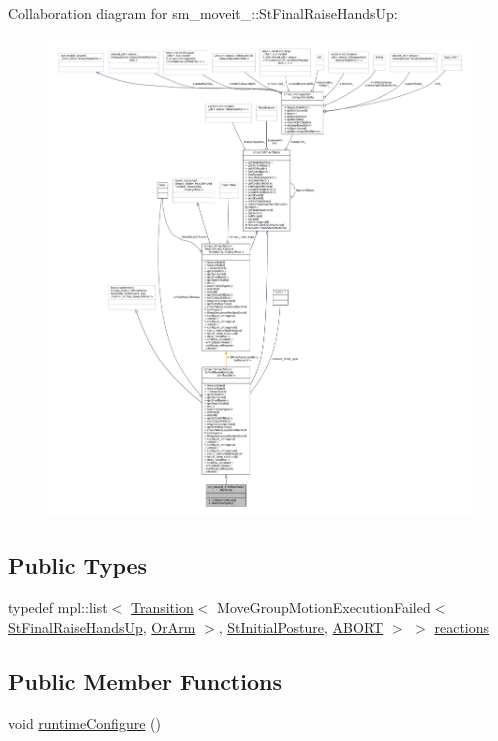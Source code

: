 Collaboration diagram for sm\+\_\+moveit\+\_\+:\+:St\+Final\+Raise\+Hands\+Up\+:
\nopagebreak
\begin{figure}[H]
\begin{center}
\leavevmode
\includegraphics[width=350pt]{structsm__moveit__4_1_1StFinalRaiseHandsUp__coll__graph}
\end{center}
\end{figure}
\subsection*{Public Types}
\begin{DoxyCompactItemize}
\item 
typedef mpl\+::list$<$ \hyperlink{classsmacc_1_1Transition}{Transition}$<$ Move\+Group\+Motion\+Execution\+Failed$<$ \hyperlink{structsm__moveit__4_1_1StFinalRaiseHandsUp}{St\+Final\+Raise\+Hands\+Up}, \hyperlink{classsm__moveit__4_1_1OrArm}{Or\+Arm} $>$, \hyperlink{structsm__moveit__4_1_1StInitialPosture}{St\+Initial\+Posture}, \hyperlink{structsmacc_1_1default__transition__tags_1_1ABORT}{A\+B\+O\+RT} $>$ $>$ \hyperlink{structsm__moveit__4_1_1StFinalRaiseHandsUp_af12b19b5e2f0f5fc3bbe6e8cee4d9bb1}{reactions}
\end{DoxyCompactItemize}
\subsection*{Public Member Functions}
\begin{DoxyCompactItemize}
\item 
void \hyperlink{structsm__moveit__4_1_1StFinalRaiseHandsUp_abf2c776a0c87aca2f9bae83228f5c5a2}{runtime\+Configure} ()
\end{DoxyCompactItemize}
